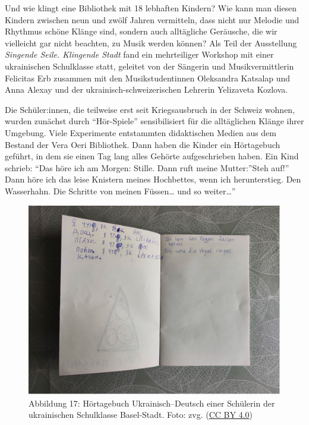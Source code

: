 \documentclass[a4paper,
fontsize=11pt,
oneside,
numbers=noperiodatend,
parskip=half-,
bibliography=totoc,
final
]{scrartcl}
\begin{document}
Und wie klingt eine Bibliothek mit 18 lebhaften Kindern? Wie kann man
diesen Kindern zwischen neun und zwölf Jahren vermitteln, dass nicht nur
Melodie und Rhythmus schöne Klänge sind, sondern auch alltägliche
Geräusche, die wir vielleicht gar nicht beachten, zu Musik werden
können? Als Teil der Ausstellung \emph{Singende Seile. Klingende Stadt}
fand ein mehrteiliger Workshop mit einer ukrainischen Schulklasse statt,
geleitet von der Sängerin und Musikvermittlerin Felicitas Erb zusammen
mit den Musikstudentinnen Oleksandra Katsalap und Anna Alexay und der
ukrainisch-schweizerischen Lehrerin Yelizaveta Kozlova.

Die Schüler:innen, die teilweise erst seit Kriegsausbruch in der Schweiz
wohnen, wurden zunächst durch \enquote{Hör-Spiele} sensibilisiert für
die alltäglichen Klänge ihrer Umgebung. Viele Experimente entstammten
didaktischen Medien aus dem Bestand der Vera Oeri Bibliothek. Dann haben
die Kinder ein Hörtagebuch geführt, in dem sie einen Tag lang alles
Gehörte aufgeschrieben haben. Ein Kind schrieb: \enquote{Das höre ich am
Morgen: Stille. Dann ruft meine Mutter:}Steh auf!'' Dann höre ich das
leise Knistern meines Hochbettes, wenn ich herunterstieg. Den
Wasserhahn. Die Schritte von meinen Füssen\ldots{} und so weiter\ldots''

\begin{figure}
\centering
\includegraphics{img/Abb17.jpg}
\caption{Abbildung 17: Hörtagebuch Ukrainisch--Deutsch einer Schülerin der
ukrainischen Schulklasse Basel-Stadt. Foto: zvg. (\href{https://creativecommons.org/licenses/by/4.0/}{CC BY 4.0})}
\end{figure}
\end{document}
